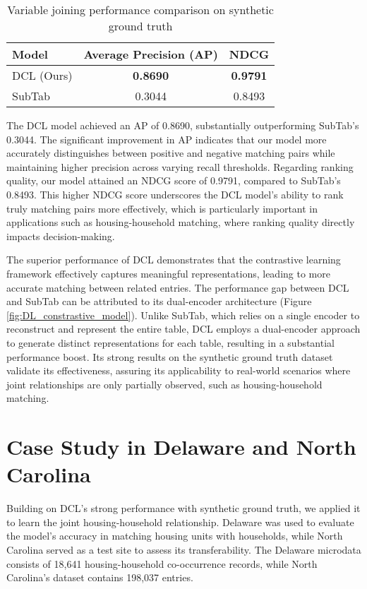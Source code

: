 \documentclass[]{nature_mod}
\begin{document}
\begin{table}[!ht]
  \centering
  \caption{Variable joining performance comparison on synthetic ground truth}
  \label{tab:synthetic_results}
  \begin{tabular}{@{}lcc@{}}
    \toprule
    \textbf{Model} & \textbf{Average Precision (AP)} & \textbf{NDCG} \\
    \midrule
    DCL (Ours) & \textbf{0.8690} & \textbf{0.9791} \\
    SubTab & 0.3044 & 0.8493 \\
    \bottomrule
  \end{tabular}
\end{table}

The DCL model achieved an AP of 0.8690, substantially outperforming SubTab’s 0.3044. The significant improvement in AP indicates that our model more accurately distinguishes between positive and negative matching pairs while maintaining higher precision across varying recall thresholds. Regarding ranking quality, our model attained an NDCG score of 0.9791, compared to SubTab’s 0.8493. This higher NDCG score underscores the DCL model’s ability to rank truly matching pairs more effectively, which is particularly important in applications such as housing-household matching, where ranking quality directly impacts decision-making. 

The superior performance of DCL demonstrates that the contrastive learning framework effectively captures meaningful representations, leading to more accurate matching between related entries. The performance gap between DCL and SubTab can be attributed to its dual-encoder architecture (Figure \ref{fig:DL_constrastive_model}). Unlike SubTab, which relies on a single encoder to reconstruct and represent the entire table, DCL employs a dual-encoder approach to generate distinct representations for each table, resulting in a substantial performance boost. Its strong results on the synthetic ground truth dataset validate its effectiveness, assuring its applicability to real-world scenarios where joint relationships are only partially observed, such as housing-household matching.

\section{Case Study in Delaware and North Carolina}\label{sec:results}

Building on DCL’s strong performance with synthetic ground truth, we applied it to learn the joint housing-household relationship. Delaware was used to evaluate the model’s accuracy in matching housing units with households, while North Carolina served as a test site to assess its transferability. The Delaware microdata consists of 18,641 housing-household co-occurrence records, while North Carolina’s dataset contains 198,037 entries.
\end{document}

